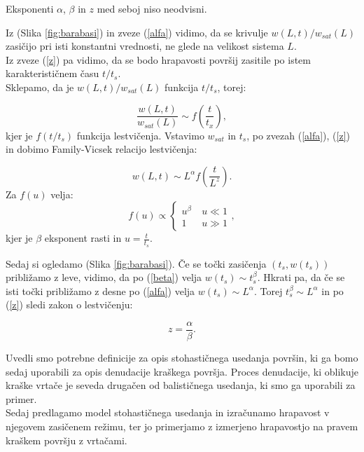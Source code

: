 \documentclass[a4paper, twoside, 12pt]{book}
\begin{document}
Eksponenti $\alpha$, $\beta$ in $z$ med seboj niso neodvisni.

Iz (Slika \ref{fig:barabasi}) in zveze (\ref{alfa}) vidimo, da se krivulje $w(L,t)/w_{sat}(L)$ zasičijo pri isti konstantni vrednosti, ne glede na velikost sistema $L$.\\
Iz zveze (\ref{z}) pa vidimo, da se bodo hrapavosti površij zasitile po istem karakterističnem času $t/t_s$. \\
Sklepamo, da je $w(L,t)/w_{sat}(L)$ funkcija $t/t_s$, torej:

  \begin{equation}
    \frac{w(L,t)}{w_{sat}(L)} \sim f(\frac{t}{t_x}),
  \end{equation}
kjer je $f(t/t_s)$ funkcija lestvičenja. Vstavimo $w_{sat}$ in $t_s$, po zvezah (\ref{alfa}), (\ref{z}) in dobimo Family-Vicsek relacijo lestvičenja:

  \begin{equation}
    w(L,t) \sim L^\alpha f(\frac{t}{L^z}).
    \label{family-vicsek}
  \end{equation}
Za $f(u)$ velja:
  \begin{equation}
    f(u) \propto \left \{ \begin{array}{lr} u^{\beta} & \ u\ll 1 \\
      1 & \ u\gg1\end{array}, \right.
    \end{equation}
kjer je $\beta$ eksponent rasti in $u=\frac{t}{t_s}$.

Sedaj si ogledamo (Slika \ref{fig:barabasi}). Če se točki zasičenja $(t_s,w(t_s))$ približamo z leve, vidimo, da po (\ref{beta}) velja $w(t_s) \sim t_s^\beta$. Hkrati pa, da če se isti točki približamo z desne po (\ref{alfa}) velja $w(t_s) \sim L^\alpha$. Torej $t_s^\beta \sim L^\alpha$ in po (\ref{z}) sledi zakon o lestvičenju:

    \begin{equation}
      z = \frac{\alpha}{\beta}.
    \end{equation}

Uvedli smo potrebne definicije za opis stohastičnega usedanja površin, ki ga bomo sedaj uporabili za opis denudacije kraškega površja. Proces denudacije, ki oblikuje kraške vrtače je seveda drugačen od balističnega usedanja, ki smo ga uporabili za primer. \\
Sedaj predlagamo model stohastičnega usedanja in izračunamo hrapavost v njegovem zasičenem režimu, ter jo primerjamo z izmerjeno hrapavostjo na pravem kraškem površju z vrtačami.
\end{document}
